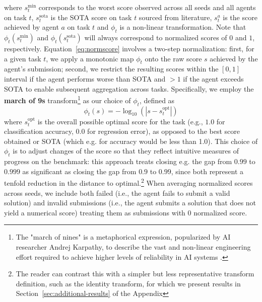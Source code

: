 \documentclass{fairmeta}
\begin{document}
where $s_t^\mathrm{min}$ corresponds to the worst score observed across all seeds and all agents on task $t$, $s_t^\mathrm{sota}$ is the SOTA score on task $t$ sourced from literature, $s_{t}^a$ is the score achieved by agent $a$ on task $t$ and $\phi_t$ is a non-linear transformation. Note that $\phi_t(s_t^\mathrm{min})$ and $\phi_t(s_t^\mathrm{sota})$ will always correspond to normalized scores of $0$ and $1$, respectively.
Equation~\ref{eq:normscore} involves a two-step normalization: first, for a given task $t$, we apply a monotonic map $\phi_t$ onto the raw score $s$ achieved by the agent's submission; second, we restrict the resulting scores within the $[0,1]$ interval if the agent performs worse than SOTA and $>1$ if the agent exceeds SOTA to enable subsequent aggregation across tasks. Specifically, we employ the \textbf{march of 9s} transform\footnote{The "march of nines" is a metaphorical expression, popularized by AI researcher Andrej Karpathy, to describe the vast and non-linear engineering effort required to achieve higher levels of reliability in AI systems \citep{karpathy_dwarkesh_2025}.} as our choice of $\phi_t$, defined as
    \begin{equation}
        \phi_t(s) = -\log_{10}(|s - s^\mathrm{opt}_t|)
    \label{eq:marchof9s}
    \end{equation}
where $s^\mathrm{opt}_t$ is the overall possible optimal score for the task (e.g., $1.0$ for classification accuracy, $0.0$ for regression error), as opposed to the best score obtained or SOTA (which e.g. for accuracy would be less than 1.0). This choice of $\phi_t$ is to adjust changes of the score so that they reflect intuitive measures of progress on the benchmark: this approach treats closing e.g. the gap from $0.99$ to $0.999$ as significant as closing the gap from $0.9$ to $0.99$, since both represent a tenfold reduction in the distance to optimal.\footnote{The reader can contrast this with a simpler but less representative transform definition, such as the identity transform, for which we present results in Section~\ref{sec:additional-results} of the Appendix} When averaging normalized scores across seeds, we include both failed (i.e., the agent fails to submit a valid solution) and invalid submissions (i.e., the agent submits a solution that does not yield a numerical score) treating them as submissions with 0 normalized score.%
\end{document}
